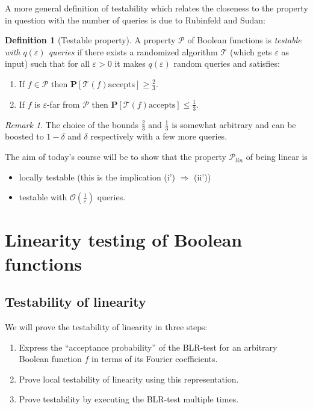 \documentclass[a4paper]{article}
\newcommand{\prob}{\mathbf{P}}
\newcommand{\prty}{\mathcal{P}}
\newcommand{\eps}{\varepsilon}
\theoremstyle{plain}
\theoremstyle{definition}
\newtheorem{definition}{Definition}
\theoremstyle{remark}
\newtheorem*{remark*}{Remark}
\begin{document}
\noindent A more general definition of testability which relates the
closeness to the property in question with the number of queries is
due to Rubinfeld and Sudan:  

\begin{definition}[Testable property] \label{def:6}
  A property \(\prty\) of Boolean functions is \emph{testable with
    \(q(\eps)\) queries} if there exists a randomized algorithm
  \(\mathcal{T}\) (which gets \(\eps\) as input) such that for all
  \(\eps > 0\) it makes \(q(\eps)\) random queries and satisfies:
  \begin{enumerate}[label=(\roman*)]
  \item If \(f \in \prty\) then \(\prob[\mathcal{T}(f) \text{
      accepts}] \geq \frac{2}{3}\).
  \item If \(f\) is \(\eps\)-far from \(\prty\) then \(\prob[\mathcal{T}(f) \text{
      accepts}] \leq \frac{1}{3}\).
  \end{enumerate}
\end{definition}

\begin{remark*}
  The choice of the bounds \(\frac{2}{3}\) and \(\frac{1}{3}\) is
  somewhat arbitrary and can be boosted to \(1-\delta\) and \(\delta\)
  respectively with a few more queries. 
\end{remark*}

\noindent The aim of today's course will be to show that the property
\(\prty_{lin}\) of being linear is 
\begin{itemize}
\item locally testable (this is the implication (i') \(\Rightarrow\)
  (ii'))
\item testable with \(\mathcal{O}\left(\frac{1}{\eps}\right)\)
  queries. 
\end{itemize}


\section{Linearity testing of Boolean functions}
\label{sec:line-test-bool}

\subsection{Testability of linearity}
\label{sec:test-line}

We will prove the testability of linearity in three steps: 
\begin{enumerate}
\item Express the ``acceptance probability'' of the \textsf{BLR}-test
  for an arbitrary Boolean function \(f\) in terms of its Fourier
  coefficients.
\item Prove local testability of linearity using this representation.
\item Prove testability by executing the \textsf{BLR}-test multiple
  times. 
\end{enumerate}
\end{document}
